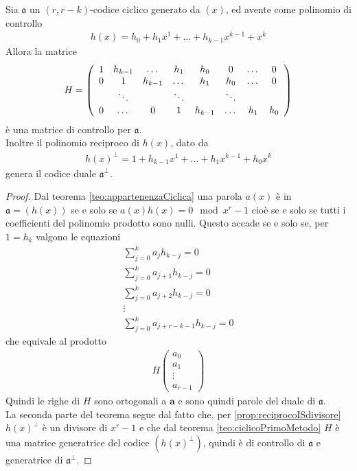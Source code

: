 \begin{teorema} \label{teo:poliControllo}
  Sia $\mathfrak{a}$ un $(r,r-k)$-codice ciclico generato da $(x)$, ed avente come polinomio di controllo
  \begin{align*}
     h(x) = h_{0} + h_{1}x^{1} + \dots + h_{k-1}x^{k-1} + x^{k}
  \end{align*}
  Allora la matrice
  \begin{align*}
      H = 
      \left(
      \begin{array} {c c c c c c c c}
      1 & h_{k-1} & \dots & h_{1} & h_{0} & 0 & \dots & 0 \\
      0 & 1 & h_{k-1} & \dots & h_{1} & h_{0} & \dots & 0  \\
       & \ddots &  & \ddots &  & \ddots &  &     \\
      0 & \dots & 0 & 1 & h_{k-1} & \dots & h_{1} & h_{0}      
      \end{array}
      \right)
   \end{align*}
   è una matrice di controllo per $\mathfrak{a}$. \\
   Inoltre il polinomio reciproco di $h(x)$, dato da
   \begin{align*}
     h(x)^{\perp} = 1 + h_{k-1}x^{1} + \dots + h_{1}x^{k-1} + h_{0}x^{k}
  \end{align*}
  genera il codice duale $\mathfrak{a}^{\perp}$.
\end{teorema}
\begin{proof}
   Dal teorema \ref{teo:appartenenzaCiclica} una parola $a(x)$ è in $\mathfrak{a} = (h(x))$ se e solo se $a(x)h(x)=0 \mod{x^r-1}$ cioè se e solo se tutti i coefficienti del polinomio prodotto sono nulli. Questo accade se e solo se, per $1 = h_{k}$ valgono le equazioni
   \begin{align*}
      \sum_{j = 0}^{k} a_{j} h_{k-j} = 0  \\
      \sum_{j = 0}^{k}  a_{j+1} h_{k-j} = 0  \\
      \sum_{j = 0}^{k} a_{j+2} h_{k-j} = 0 \\
      \vdots \\
      \sum_{j = 0}^{k}  a_{j+r-k-1} h_{k-j} = 0 
    \end{align*}
    che equivale al prodotto
    \begin{align*}
       H
       \left(
	\begin{array} {c}
	a_0   \\
	a_1    \\
	\vdots   \\
	a_{r-1}
	\end{array}
	\right)
    \end{align*}
   Quindi le righe di $H$ sono ortogonali a $\mathbf{a}$ e sono quindi parole del duale di $\mathfrak{a}$.\\
   La seconda parte del teorema segue dal fatto che, per \ref{prop:reciprocoISdivisore} $h(x)^{\perp}$ è un divisore di $x^r - 1$ e che dal teorema \ref{teo:ciclicoPrimoMetodo} $H$ è una matrice generatrice del codice $(h(x)^{\perp})$, quindi è di controllo di $\mathfrak{a}$ e generatrice di $\mathfrak{a}^{\perp}$.
\end{proof}
